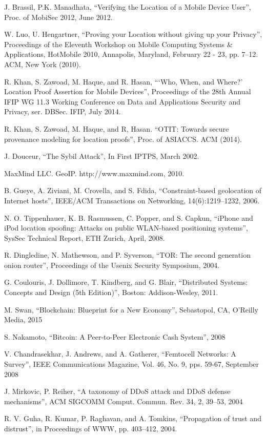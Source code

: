 \documentclass[12pt]{report}
\begin{document}
\newpage
\begin{thebibliography}{9}

  J. Brassil, P.K. Manadhata,
  ``Verifying the Location of a Mobile Device User'',
  Proc. of MobiSec 2012,
  June 2012.

  W. Luo, U. Hengartner,
  ``Proving your Location without giving up your Privacy'',
  Proceedings of the Eleventh Workshop on Mobile Computing Systems \& Applications,
  HotMobile 2010, Annapolis, Maryland, February 22 - 23, pp. 7–12. ACM,
  New York (2010).

  R. Khan, S. Zawoad, M. Haque, and R. Hasan,
  ```Who, When, and Where?' Location Proof Assertion for Mobile Devices'',
  Proceedings of the 28th Annual IFIP WG 11.3 Working Conference on Data and Applications Security and Privacy, ser. DBSec. IFIP,
  July 2014.
 
  R. Khan, S. Zawoad, M. Haque, and R, Hasan.
  ``OTIT: Towards secure provenance modeling for location proofs'',
  Proc. of ASIACCS. ACM (2014).

  J. Douceur,
  ``The Sybil Attack'',
  In First IPTPS,
  March 2002.

  MaxMind LLC. GeoIP. http://www.maxmind.com,
  2010.

  B. Gueye, A. Ziviani, M. Crovella, and S. Fdida,
  ``Constraint-based geolocation of Internet hosts'',
  IEEE/ACM Transactions on Networking,
  14(6):1219–1232, 2006.

  N. O. Tippenhauer, K. B. Rasmussen, C. Popper, and S. Capkun,
  ``iPhone and iPod location spoofing: Attacks on public WLAN-based positioning systems'',
  SysSec Technical Report,
  ETH Zurich, April, 2008.

  R. Dingledine, N. Mathewson, and P. Syverson,
  ``TOR: The second generation onion router'',
  Proceedings of the Usenix Security Symposium,
  2004.

  G. Coulouris, J. Dollimore, T. Kindberg, and G. Blair,
  ``Distributed Systems: Concepts and Design (5th Edition)'',
  Boston: Addison-Wesley,
  2011.

  M. Swan,
  ``Blockchain: Blueprint for a New Economy'',
  Sebastopol, CA,
  O’Reilly Media, 2015

  S. Nakamoto,
  ``Bitcoin: A Peer-to-Peer Electronic Cash System'',
  2008
  
  V. Chandrasekhar, J. Andrews, and A. Gatherer,
  ``Femtocell Networks: A Survey'',
  IEEE Communications Magazine, Vol. 46, No. 9, pps. 59-67,
  September 2008
  
  J. Mirkovic, P. Reiher,
  ``A taxonomy of DDoS attack and DDoS defense mechanisms'',
  ACM SIGCOMM Comput. Commun. Rev. 34, 2, 39–53,
  2004

  R. V. Guha, R. Kumar, P. Raghavan, and A. Tomkins,
  ``Propagation of trust and distrust'',
  in Proceedings of WWW, pp. 403–412,
  2004.

\end{thebibliography}
\end{document}
